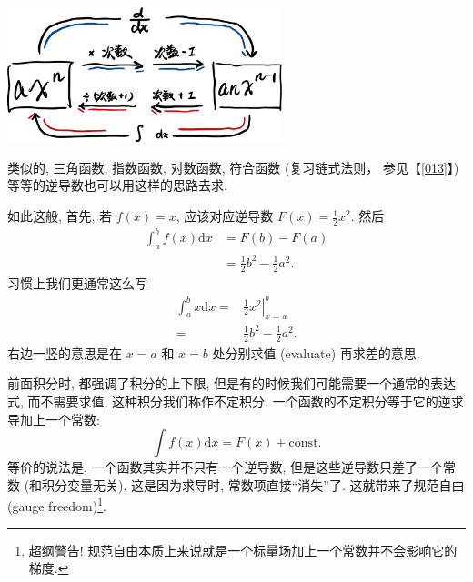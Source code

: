 \begin{tcolorbox}[size=fbox, breakable, enhanced jigsaw, title={微积分基本定理 (fundamental theorem of calculus)}]
\begin{newquote}
\begin{tcolorbox}[size=fbox, breakable, enhanced jigsaw]
\includegraphics[width=0.6\textwidth]{img/image-20230912161734076.png}

\end{tcolorbox}

类似的, 三角函数, 指数函数, 对数函数, 符合函数 (复习链式法则，
参见【\ref{013}】) 等等的逆导数也可以用这样的思路去求.

如此这般, 首先, 若 \(f(x)=x\), 应该对应逆导数 \(F(x)=\frac{1}{2}x^2\).
然后 \[
\begin{aligned}
  \int_a^bf(x)\mathrm{d}x&=F(b)-F(a)\\
  &=\frac{1}{2}b^2-\frac{1}{2}a^2.
\end{aligned}
\] 习惯上我们更通常这么写 \[
\begin{aligned}
\int_a^bx\mathrm{d}x=&\left.\frac{1}{2}x^2\right|_{x=a}^b\\
=&\frac{1}{2}b^2-\frac{1}{2}a^2.
\end{aligned}
\] 右边一竖的意思是在 \(x=a\) 和 \(x=b\) 处分别求值 (evaluate)
再求差的意思.
\end{newquote}

\begin{tcolorbox}[size=fbox, breakable, enhanced jigsaw, title={不定积分}]

前面积分时, 都强调了积分的上下限,
但是有的时候我们可能需要一个通常的表达式, 而不需要求值,
这种积分我们称作不定积分. 一个函数的不定积分等于它的逆求导加上一个常数:
\[
\int f(x)\mathrm{d}x=F(x)+\text{const.}
\] 等价的说法是, 一个函数其实并不只有一个逆导数,
但是这些逆导数只差了一个常数 (和积分变量无关). 这是因为求导时,
常数项直接``消失''了. 这就带来了规范自由 (gauge freedom)\footnote{超纲警告!
  规范自由本质上来说就是一个标量场加上一个常数并不会影响它的梯度.}.

\end{tcolorbox}
\end{tcolorbox}